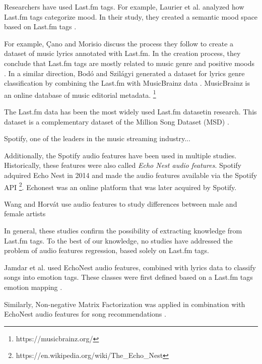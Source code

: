 \documentclass[sn-mathphys]{sn-jnl}%
\theoremstyle{thmstyleone}%
\theoremstyle{thmstyletwo}%
\theoremstyle{thmstylethree}%
\begin{document}
Researchers have used Last.fm tags.
For example, Laurier et al. analyzed how Last.fm tags categorize mood.
In their study, they created a semantic mood space based on Last.fm tags \cite{laurier2009music}.

For example, {\c{C}}ano and Morisio discuss the process they follow to create a dataset of music
lyrics annotated with Last.fm.
In the creation process, they conclude that Last.fm tags are mostly related to music genre
and positive moods \cite{ccano2017music}.
In a similar direction, Bod{\'o} and Szil{\'a}gyi generated a dataset for lyrics genre classification
by combining the Last.fm with MusicBrainz data \cite{bodo2018connecting}.
MusicBrainz \footnotemark[1] is an online database of music editorial metadata.
\footnote[1]{https://musicbrainz.org/}

The Last.fm data has been the most widely used Last.fm dataset\footnotemark[2] in research.
This dataset is a complementary dataset of the Million Song Dataset (MSD) \cite{Bertin-Mahieux2011}.


Spotify, one of the leaders in the music streaming industry...

Additionally, the Spotify audio features have been used in multiple studies.
Historically, these features were also called \emph{Echo Nest audio features}.
Spotify adquired Echo Nest in 2014 and made the audio features available via the Spotify  API
\footnote[3]{https://en.wikipedia.org/wiki/The\_Echo\_Nest}.
Echonest was an online platform that was later acquired by Spotify.

Wang and Horv{\'a}t use audio features to study differences between male and female artists \cite{wang2019gender}


In general, these studies confirm the possibility of extracting knowledge from Last.fm tags.
To the best of our knowledge, no studies have addressed the problem of audio features regression, based solely on Last.fm tags.

Jamdar et al. used EchoNest audio features, combined with lyrics data to classify songs into emotion tags.
These classes were first defined based on a Last.fm tags emotion mapping \cite{jamdar2015emotion}.

Similarly, Non-negative Matrix Factorization was applied in combination with EchoNest audio features
for song recommendations \cite{benzi2016song}.
\end{document}
